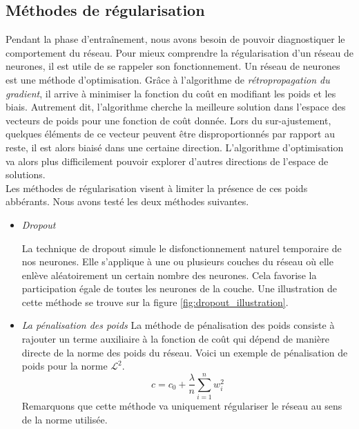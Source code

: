 \documentclass[a4paper,11pt]{article}
\begin{document}
\subsection{Méthodes de régularisation}
\label{sec:regularization}
    
    Pendant la phase d'entraînement, nous avons besoin de pouvoir diagnostiquer le comportement du réseau.
    Pour mieux comprendre la régularisation d'un réseau de neurones, il est utile de se rappeler son fonctionnement.
    Un réseau de neurones est une méthode d'optimisation.
    Grâce à l'algorithme de \textit{rétropropagation du gradient}, il arrive à minimiser la fonction
    du coût en modifiant les poids et les biais.
    Autrement dit, l'algorithme cherche la meilleure solution dans l'espace des vecteurs de poids pour une fonction de coût donnée.
    Lors du sur-ajustement, quelques éléments de ce vecteur peuvent être disproportionnés par
    rapport au reste, il est alors biaisé dans une certaine direction.
    L'algorithme d'optimisation va alors plus difficilement pouvoir explorer d'autres directions de l'espace de solutions.
    \\
    Les méthodes de régularisation visent à limiter la présence de ces poids abbérants.
    Nous avons testé les deux méthodes suivantes. 
    \begin{itemize}
        \item{\textit{Dropout}}

            La technique de dropout simule le disfonctionnement naturel temporaire de nos neurones.
            Elle s'applique à une ou plusieurs couches du réseau où elle enlève aléatoirement un certain nombre des neurones.
            Cela favorise la participation égale de toutes les neurones de la couche.
            Une illustration de cette méthode se trouve sur la figure \ref{fig:dropout_illustration}. 

        \item{\textit{La pénalisation des poids}}
            La méthode de pénalisation des poids consiste à rajouter un terme auxiliaire à la fonction de coût qui dépend de manière directe de la norme des poids du réseau.
            Voici un exemple de pénalisation de poids pour la norme $\mathcal{L}^2$.
            \begin{equation*}
                c = c_0 + \frac{\lambda}{n}\sum_{i=1}^n w_i^2
            \end{equation*}
        Remarquons que cette méthode va uniquement régulariser le réseau au sens de la norme utilisée.
    \end{itemize}
\end{document}
